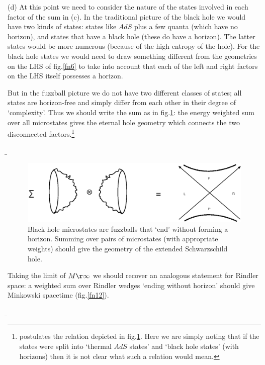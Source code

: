 \documentclass[11pt]{article}
\begin{document}
(d) At this point we need to consider the  nature of the states involved in each factor of the sum in (c). In the traditional picture of the black hole we would have two kinds of states: states like $AdS$  plus a few  quanta (which have no horizon), and states that have a black hole (these do have a horizon). The latter states would be more numerous (because of the high entropy of the hole).  For the black hole states we would need to draw something different from the geometries  on the LHS of  fig.\ref{fn6} to take into account that each of the left and right factors on the LHS itself possesses a horizon.  

But in the fuzzball picture we do not have two different classes of states; all states are horizon-free and simply differ from each other in their degree of `complexity'. Thus we should write the sum as in fig.\ref{fn7}: the energy weighted sum over all microstates gives the eternal hole geometry which connects the two disconnected factors.\footnote{\cite{raamsdonk}  postulates the relation depicted in fig.\ref{fn7}. Here we are simply noting that if the states were split into `thermal $AdS$ states' and `black hole states' (with horizons) then it is not clear what such a relation would mean.}

\b

\begin{figure}[htbp]
\begin{center}
\includegraphics[scale=.85]{fn7.eps}
\caption{{Black hole microstates are fuzzballs that `end' without forming a horizon. Summing over pairs of microstates (with appropriate weights) should give the geometry of the extended Schwarzschild hole.}}
\label{fn7}
\end{center}
\end{figure}

Taking the limit of $M\r\infty$ we should recover an analogous statement for Rindler space: a weighted sum over Rindler wedges `ending without horizon' should give Minkowski spacetime (fig.\ref{fn12}). 

\b
\end{document}
